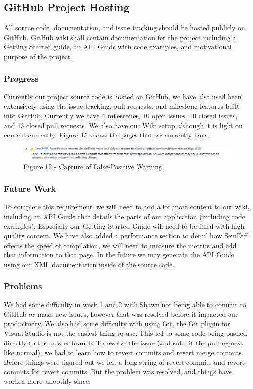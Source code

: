 \documentclass[10pt,draftclsnofoot,onecolumn]{IEEEtran}
\begin{document}
\subsection{GitHub Project Hosting}
All source code, documentation, and issue tracking should be hosted publicly on GitHub.
GitHub wiki shall contain documentation for the project including a Getting Started guide, an API Guide with code examples, and motivational purpose of the project.

\subsubsection{Progress}
Currently our project source code is hosted on GitHub, we have also used been extensively using the issue tracking, pull requests, and milestone features built into GitHub. Currently we have 4 milestones, 10 open issues, 10 closed issues, and 13 closed pull requests. We also have our Wiki setup although it is light on content currently. Figure 15 shows the pages that we currently have.

\begin{figure}[h!]
	\includegraphics[width=\linewidth]{falsePositiveWarning.png}
	\caption*{Figure 12 - Capture of False-Positive Warning}
\end{figure}

\subsubsection{Future Work}
To complete this requirement, we will need to add a lot more content to our wiki, including an API Guide that details the parts of our application (including code examples). Especially our Getting Started Guide will need to be filled with high quality content. We have also added a performance section to detail how SemDiff effects the speed of compilation, we will need to measure the metrics and add that information to that page. In the future we may generate the API Guide using our XML documentation inside of the source code.

\subsubsection{Problems}
We had some difficulty in week 1 and 2 with Shawn not being able to commit to GitHub or make new issues, however that was resolved before it impacted our productivity. We also had some difficulty with using Git, the Git plugin for Visual Studio is not the easiest thing to use. This led to some code being pushed directly to the master branch. To resolve the issue (and submit the pull request like normal), we had to learn how to revert commits and revert merge commits. Before things were figured out we left a long string of revert commits and revert commits for revert commits. But the problem was resolved, and things have worked more smoothly since.
\end{document}
